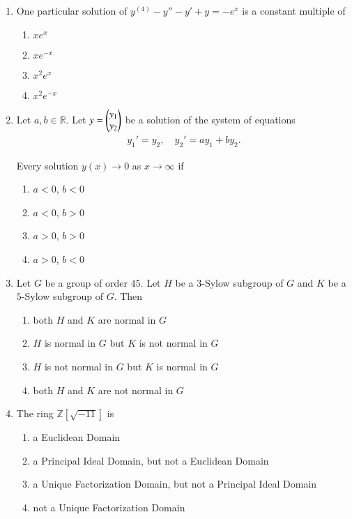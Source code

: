 \documentclass[journal]{IEEEtran}
\numberwithin{equation}{enumi}
\numberwithin{figure}{enumi}
\begin{document}
\begin{enumerate}
\item
One particular solution of $y^{(4)} - y'' - y' + y = -e^x$ is a constant multiple of
\hfill{}
\begin{multicols}{4}
\begin{enumerate}
    \item $x e^x$
    \item $x e^{-x}$
    \item $x^2 e^x$
    \item $x^2 e^{-x}$
\end{enumerate}
\end{multicols}


\item
Let $a, b \in \mathbb{R}$. Let $y = \begin{pmatrix}y_1 \\ y_2\end{pmatrix}$ be a solution of the system of equations
\begin{align}
    y_1' = y_2, \quad y_2' = a y_1 + b y_2.
\end{align}

Every solution $y(x) \to 0$ as $x \to \infty$ if
\hfill{}
\begin{multicols}{4}
\begin{enumerate}
    \item $a < 0$, $b < 0$
    \item $a < 0$, $b > 0$
    \item $a > 0$, $b > 0$
    \item $a > 0$, $b < 0$
\end{enumerate}    
\end{multicols}


\item
Let $G$ be a group of order $45$. Let $H$ be a $3$-Sylow subgroup of $G$ and $K$ be a $5$-Sylow subgroup of $G$. Then
\hfill{}
\begin{enumerate}
    \item both $H$ and $K$ are normal in $G$
    \item $H$ is normal in $G$ but $K$ is not normal in $G$
    \item $H$ is not normal in $G$ but $K$ is normal in $G$
    \item both $H$ and $K$ are not normal in $G$
\end{enumerate}

\item
The ring $\mathbb{Z}[\sqrt{-11}]$ is
\hfill{}
\begin{enumerate}
    \item a Euclidean Domain
    \item a Principal Ideal Domain, but not a Euclidean Domain
    \item a Unique Factorization Domain, but not a Principal Ideal Domain
    \item not a Unique Factorization Domain
\end{enumerate}


\end{enumerate}
\end{document}
